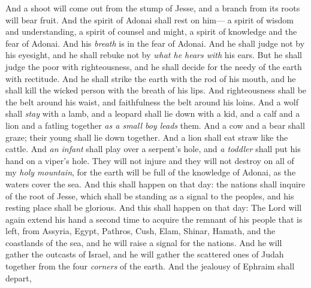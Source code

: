 \begin{biblechapter} %
 And a shoot will come out from the stump of Jesse, 
and a branch from its roots will bear fruit.
\verse And the spirit of Adonai shall rest on him— 
a spirit of wisdom and understanding, 
a spirit of counsel and might, 
a spirit of knowledge and the fear of Adonai.
\verse And his \textit{breath} is in the fear of Adonai. 
And he shall judge not by his eyesight, 
and he shall rebuke not by \textit{what he hears with} his ears.
\verse But he shall judge the poor with righteousness, 
and he shall decide for the needy of the earth with rectitude. 
And he shall strike the earth with the rod of his mouth, 
and he shall kill the wicked person with the breath of his lips.
\verse And righteousness shall be the belt around his waist, 
and faithfulness the belt around his loins.
\verse And a wolf shall \textit{stay} with a lamb, 
and a leopard shall lie down with a kid, 
and a calf and a lion and a fatling together 
\textit{as a small boy leads} them.
\verse And a cow and a bear shall graze; 
their young shall lie down together. 
And a lion shall eat straw like the cattle.
\verse And \textit{an infant} shall play over a serpent’s hole, 
and \textit{a toddler} shall put his hand on a viper’s hole.
\verse They will not injure and they will not destroy on all of my \textit{holy mountain}, 
for the earth will be full of the knowledge of Adonai, 
as the waters cover the sea.
\verse And this shall happen on that day: the nations shall inquire of the root of Jesse, 
which shall be standing as a signal to the peoples, 
and his resting place shall be glorious.
 And this shall happen on that day:
\verse The Lord will again extend his hand a second time 
to acquire the remnant of his people that is left, 
from Assyria, Egypt, Pathros, Cush, Elam, Shinar, Hamath, and the coastlands of the sea,
\verse and he will raise a signal for the nations. 
And he will gather the outcasts of Israel, 
and he will gather the scattered ones of Judah together from the four \textit{corners} of the earth.
\verse And the jealousy of Ephraim shall depart, 

\end{biblechapter}
